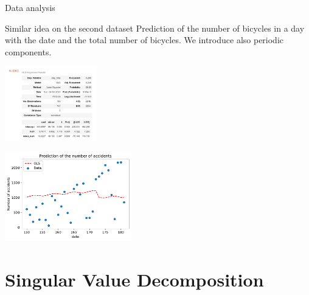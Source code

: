 \documentclass[unknownkeysallowed]{beamer}
\begin{document}

\begin{frame}{Data analysis}

\begin{block}{Similar idea on the second dataset}
Prediction of the number of bicycles in a day with the date and the total number of bicycles. We introduce also periodic components.
\end{block}


\begin{minipage}[c]{.36\linewidth}
     \begin{center}
             \includegraphics[width=4cm]{stat_model_albert}
         \end{center}
   \end{minipage} \hfill
   \begin{minipage}[c]{.55\linewidth}
    \begin{center}
            \includegraphics[width=5.5cm]{accidentpredictionalbert1}
            
        \end{center}

 \end{minipage}
\end{frame}

\section{Singular Value Decomposition}
\label{sec:conclusion}
\end{document}
